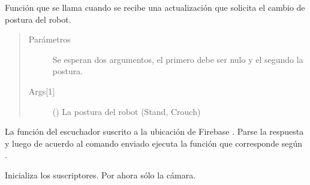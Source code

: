 \begin{fulllineitems}
\label{\detokenize{nao_firebase:fire_nao.change_posture}}
Función que se llama cuando se recibe una actualización que solicita
el cambio de postura del robot.
\begin{quote}\begin{description}
\item[{Parámetros}] \leavevmode
{} \textendash{} Se esperan dos argumentos, el primero debe ser nulo y el segundo la postura.

\item[{Args{[}1{]}}] \leavevmode
() La postura del robot (Stand, Crouch)

\end{description}\end{quote}

\end{fulllineitems}


\begin{fulllineitems}
\label{\detokenize{nao_firebase:fire_nao.commands_handler}}
La función del escuchador suscrito a la ubicación de Firebase
. Parse la respuesta y luego de acuerdo al comando enviado
ejecuta la función que corresponde según .

\end{fulllineitems}


\begin{fulllineitems}
\label{\detokenize{nao_firebase:fire_nao.init_subscribers}}
Inicializa los suscriptores. Por ahora sólo la cámara.

\end{fulllineitems}


